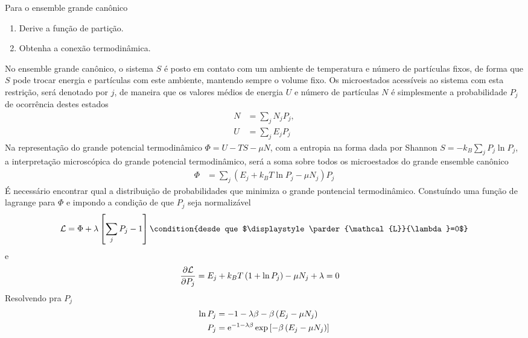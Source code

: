\begin{prob}
  Para o ensemble grande canônico
  \begin{enumerate}[label=\alph *)]
    \item Derive a função de partição.
    \item Obtenha a conexão termodinâmica.
  \end{enumerate}
  \begin{sol}
    No ensemble grande canônico, o sistema $S$ é posto em contato com um ambiente de temperatura e número de partículas fixos, de forma que $S$ pode trocar energia e partículas com este ambiente, mantendo sempre o volume fixo. Os microestados acessíveis ao sistema com esta restrição, será denotado por $j$, de maneira que os valores médios de energia $U$ e número de partículas $N$ é simplesmente a probabilidade $P_{j}$ de ocorrência destes estados
    \begin{align}
      N&=\sum_{j}N_jP_{j},\\
      U&=\sum_{j}E_{j}P_{j}
    \end{align}
    Na representação do grande potencial termodinâmico $\Phi =U-TS-\mu N$, com a entropia na forma dada por Shannon $S=-k_B\sum_jP_j\ln P_{j}$, a interpretação microscópica do grande potencial termodinâmico, será a soma sobre todos os microestados do grande ensemble canônico
    \begin{align}
      \Phi&=\sum_j\left(E_j+k_BT\ln P_j-\mu N_j\right)P_j
    \end{align}
    É necessário encontrar qual a distribuição de probabilidades que minimiza o grande pontencial termodinâmico. Constuíndo uma função de lagrange para $\Phi$ e impondo a condição de que $P_j$ seja normalizável
    \begin{dmath*}
      \mathcal{L}=\Phi+\lambda\left[\sum_jP_j-1\right]\condition{desde que $\displaystyle\parder{\mathcal{L}}{\lambda}=0$}
    \end{dmath*}
    e
    \begin{align}
      \frac{\partial {\mathcal{L}}}{\partial {P_j}}&=E_j+k_BT\left(1+\ln P_j\right)-\mu N_j+\lambda=0
    \end{align}
    Resolvendo pra $P_j$
    \begin{align}
      \begin{split}
        \ln P_j&=-1-\lambda\beta-\beta\left(E_j-\mu N_j\right)\\
        P_j&=\E^{-1-\lambda\beta}\exp\left[-\beta\left(E_j-\mu N_j\right)\right]

\end{split}
\end{align}
\end{sol}
\end{prob}
